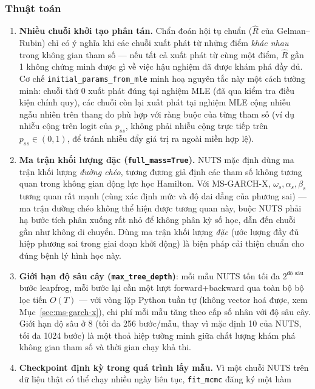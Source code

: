 \documentclass[11pt,a4paper]{article}
\newcommand{\code}[1]{\texttt{#1}}
\begin{document}
\subsubsection{Thuật toán}

\begin{enumerate}
  \item \textbf{Nhiều chuỗi khởi tạo phân tán.} Chẩn đoán hội tụ chuẩn ($\hat R$ của
    Gelman--Rubin) chỉ có ý nghĩa khi các chuỗi xuất phát từ những điểm \emph{khác
    nhau} trong không gian tham số --- nếu tất cả xuất phát từ cùng một điểm, $\hat
    R$ gần 1 không chứng minh được gì về việc hậu nghiệm đã được khám phá đầy đủ. Cơ
    chế \code{initial\_params\_from\_mle} minh hoạ nguyên tắc này một cách tường
    minh: chuỗi thứ 0 xuất phát đúng tại nghiệm MLE (đã qua kiểm tra điều kiện chính
    quy), các chuỗi còn lại xuất phát tại nghiệm MLE cộng nhiễu ngẫu nhiên trên thang
    đo phù hợp với ràng buộc của từng tham số (ví dụ nhiễu cộng trên logit của
    $p_{ss}$, không phải nhiễu cộng trực tiếp trên $p_{ss}\in(0,1)$, để tránh nhiễu
    đẩy giá trị ra ngoài miền hợp lệ).
  \item \textbf{Ma trận khối lượng đặc (\code{full\_mass=True}).} NUTS mặc định dùng
    ma trận khối lượng \emph{đường chéo}, tương đương giả định các tham số không
    tương quan trong không gian động lực học Hamilton. Với MS-GARCH-X, $\omega_s,
    \alpha_s,\beta_s$ tương quan rất mạnh (cùng xác định mức và độ dai dẳng của
    phương sai) --- ma trận đường chéo không thể hiện được tương quan này, buộc NUTS
    phải hạ bước tích phân xuống rất nhỏ để không phân kỳ số học, dẫn đến chuỗi gần
    như không di chuyển. Dùng ma trận khối lượng \emph{đặc} (ước lượng đầy đủ hiệp
    phương sai trong giai đoạn khởi động) là biện pháp cải thiện chuẩn cho đúng bệnh
    lý hình học này.
  \item \textbf{Giới hạn độ sâu cây (\code{max\_tree\_depth})}: mỗi mẫu NUTS tốn tối
    đa $2^{\text{độ sâu}}$ bước leapfrog, mỗi bước lại cần một lượt forward+backward
    qua toàn bộ bộ lọc tiến $O(T)$ --- với vòng lặp Python tuần tự (không vector hoá
    được, xem Mục~\ref{sec:ms-garch-x}), chi phí mỗi mẫu tăng theo cấp số nhân với
    độ sâu cây. Giới hạn độ sâu ở 8 (tối đa 256 bước/mẫu, thay vì mặc định 10 của
    NUTS, tối đa 1024 bước) là một thoả hiệp tường minh giữa chất lượng khám phá
    không gian tham số và thời gian chạy khả thi.
  \item \textbf{Checkpoint định kỳ trong quá trình lấy mẫu.} Vì một chuỗi NUTS trên
    dữ liệu thật có thể chạy nhiều ngày liên tục, \code{fit\_mcmc} đăng ký một hàm

\end{enumerate}
\end{document}
